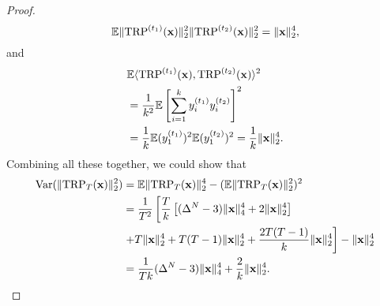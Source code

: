 \begin{proof}
\begin{equation}
\mathbb{E} \|\textup{TRP}^{(t_1)}(\mathbf{x})\|^2_2\|\textup{TRP}^{(t_2)}(\mathbf{x})\|^2_2= \|\mathbf{x}\|_2^4, \nonumber 
\end{equation}
and 
\begin{equation} 
\begin{aligned}
&\mathbb{E} \langle \textup{TRP}^{(t_1)}(\mathbf{x}), \textup{TRP}^{(t_2)}(\mathbf{x}) \rangle^2\\ 
&=\frac{1}{k^2} \mathbb{E} \left[ \sum_{i=1}^k y^{(t_1)}_i y^{(t_2)}_i \right]^2 \\
&= \frac{1}{k}  \mathbb{E} (y^{(t_1)}_1)^2\mathbb{E} (y^{(t_2)}_1)^2 = \frac{1}{k}\|\mathbf{x}\|_2^4. \nonumber
\end{aligned}
\end{equation}
Combining all these together, we could show that 
\begin{equation}
\begin{aligned}
\textrm{Var}(\|\textup{TRP}_T(\mathbf{x})\|_2^2) &= \mathbb{E}\|\textup{TRP}_T(\mathbf{x})\|^4_2 -  (\mathbb{E}\|\textup{TRP}_T(\mathbf{x})\|^2_2)^2\\ 
&= \frac{1}{T^2} \left[ \frac{T}{k}\left[(\Delta^N-3)\|\mathbf{x}\|_4^4 +2\|\mathbf{x}\|_2^4 \right]\right.\\
&\left. + T\|\mathbf{x}\|_2^4 +T(T-1)\|\mathbf{x}\|_2^4+\frac{2T(T-1)}{k}\|\mathbf{x}\|_2^4 \right] - \|\mathbf{x}\|_2^4 \\ 
&= \frac{1}{Tk}(\Delta^N-3)\|\mathbf{x}\|_4^4 + \frac{2}{k}\|\mathbf{x}\|_2^4. \nonumber
\end{aligned}
\end{equation}
\end{proof}

